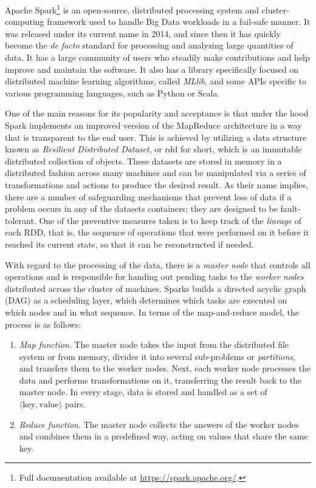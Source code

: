 Apache Spark\footnote{Full documentation available at \url{https://spark.apache.org/}.} is an open-source, distributed processing system and cluster-computing framework used to handle Big Data workloads in a fail-safe manner. It was released under its current name in 2014, and since then it has quickly become the \textit{de facto} standard for processing and analyzing large quantities of data. It has a large community of users who steadily make contributions and help improve and maintain the software. It also has a library specifically focused on distributed machine learning algorithms, called \textit{MLlib}, and some APIs specific to various programming languages, such as Python or Scala.

One of the main reasons for its popularity and acceptance is that under the hood Spark implements an improved version of the MapReduce architecture in a way that is transparent to the end user. This is achieved by utilizing a data structure known as \textit{Resilient Distributed Dataset}, or \acrshort{rdd} for short, which is an immutable distributed collection of objects. These datasets are stored in memory in a distributed fashion across many machines and can be manipulated via a series of transformations and actions to produce the desired result. As their name implies, there are a number of safeguarding mechanisms that prevent loss of data if a problem occurs in any of the datasets containers; they are designed to be fault-tolerant. One of the preventive measures taken is to keep track of the \textit{lineage} of each RDD, that is, the sequence of operations that were performed on it before it reached its current state, so that it can be reconstructed if needed.

With regard to the processing of the data, there is a \textit{master node} that controls all operations and is responsible for handing out pending tasks to the \textit{worker nodes} distributed across the cluster of machines. Sparks builds a directed acyclic graph (DAG) as a scheduling layer, which determines which tasks are executed on which nodes and in what sequence. In terms of the map-and-reduce model, the process is as follows:

\begin{enumerate}[1.]
  \item \textit{Map function}. The master node takes the input from the distributed file system or from memory, divides it into several sub-problems or \textit{partitions}, and transfers them to the worker nodes. Next, each worker node processes the data and performs transformations on it, transferring the result back to the master node. In every stage, data is stored and handled as a set of $\langle \text{key},\text{value}\rangle$ pairs.
  \item \textit{Reduce function}. The master node collects the answers of the worker nodes and combines them in a predefined way, acting on values that share the same key.
\end{enumerate}

